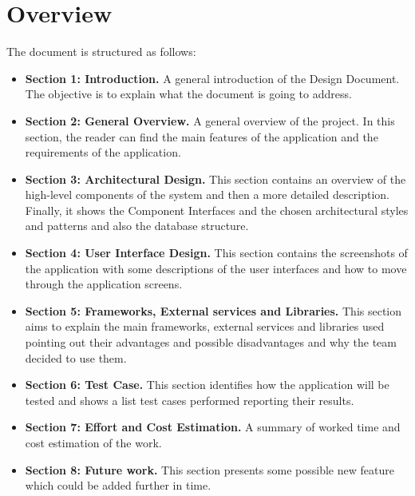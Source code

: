 	\section{Overview}
		The document is structured as follows:
		\begin{itemize}
			\item \textbf{Section 1: Introduction.} A general introduction of the Design Document. The objective is to explain what the document is going to address.

			\item \textbf {Section 2: General Overview.} A general overview of the project. In this section, the reader can find the main features of the application and
			the requirements of the application.

			\item \textbf{Section 3: Architectural Design.} This section contains an overview of the high-level components of the system and then a more detailed 
			description. Finally, it shows the Component Interfaces and the chosen architectural styles and patterns and also the database structure.
			
			\item \textbf{Section 4: User Interface Design.} This section contains the screenshots of the application with some descriptions of the user interfaces 
			and how to move through the application screens.
			
			\item \textbf{Section 5: Frameworks, External services and Libraries.} This section aims to explain the main frameworks, external services and libraries used 
			pointing out their advantages and possible disadvantages and why the team decided to use them.
			
			\item \textbf{Section 6: Test Case.} This section identifies how the application will be tested and shows a list test cases performed reporting their results.
			
			\item \textbf{Section 7: Effort and Cost Estimation.} A summary of worked time and cost estimation of the work.
			
			\item \textbf{Section 8: Future work.} This section presents some possible new feature which could be added further in time.
		\end{itemize}